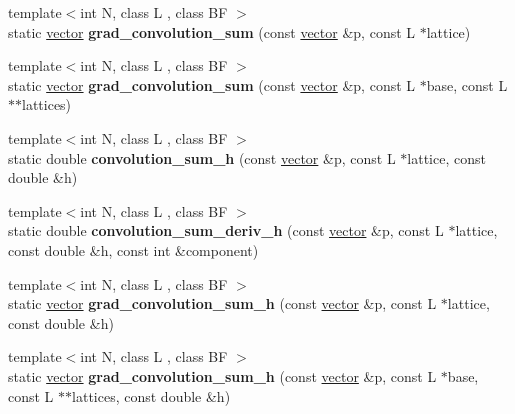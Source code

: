 \begin{DoxyCompactItemize}
{\footnotesize template$<$int N, class L , class BF $>$ }\\static \hyperlink{namespacesisl_a2069bd5374a9be042ff3ce3306d41e1a}{vector} {\bfseries grad\+\_\+convolution\+\_\+sum} (const \hyperlink{namespacesisl_a2069bd5374a9be042ff3ce3306d41e1a}{vector} \&p, const L $\ast$lattice)
\item 
\mbox{\label{classsisl_1_1nearest__neighbor_a0664ce6f5183fe3bcdf4397523bb9956}} 
{\footnotesize template$<$int N, class L , class BF $>$ }\\static \hyperlink{namespacesisl_a2069bd5374a9be042ff3ce3306d41e1a}{vector} {\bfseries grad\+\_\+convolution\+\_\+sum} (const \hyperlink{namespacesisl_a2069bd5374a9be042ff3ce3306d41e1a}{vector} \&p, const L $\ast$base, const L $\ast$$\ast$lattices)
\item 
\mbox{\label{classsisl_1_1nearest__neighbor_a879c49cd3b642c8ddc5d5da4426b0e7f}} 
{\footnotesize template$<$int N, class L , class BF $>$ }\\static double {\bfseries convolution\+\_\+sum\+\_\+h} (const \hyperlink{namespacesisl_a2069bd5374a9be042ff3ce3306d41e1a}{vector} \&p, const L $\ast$lattice, const double \&h)
\item 
\mbox{\label{classsisl_1_1nearest__neighbor_a5f13e5fd3eee54b8005a6398bae01ef4}} 
{\footnotesize template$<$int N, class L , class BF $>$ }\\static double {\bfseries convolution\+\_\+sum\+\_\+deriv\+\_\+h} (const \hyperlink{namespacesisl_a2069bd5374a9be042ff3ce3306d41e1a}{vector} \&p, const L $\ast$lattice, const double \&h, const int \&component)
\item 
\mbox{\label{classsisl_1_1nearest__neighbor_a704a5a15db9d47c51137d384c1bdbeef}} 
{\footnotesize template$<$int N, class L , class BF $>$ }\\static \hyperlink{namespacesisl_a2069bd5374a9be042ff3ce3306d41e1a}{vector} {\bfseries grad\+\_\+convolution\+\_\+sum\+\_\+h} (const \hyperlink{namespacesisl_a2069bd5374a9be042ff3ce3306d41e1a}{vector} \&p, const L $\ast$lattice, const double \&h)
\item 
\mbox{\label{classsisl_1_1nearest__neighbor_a75d7b379c635661c35fafd06b8482b89}} 
{\footnotesize template$<$int N, class L , class BF $>$ }\\static \hyperlink{namespacesisl_a2069bd5374a9be042ff3ce3306d41e1a}{vector} {\bfseries grad\+\_\+convolution\+\_\+sum\+\_\+h} (const \hyperlink{namespacesisl_a2069bd5374a9be042ff3ce3306d41e1a}{vector} \&p, const L $\ast$base, const L $\ast$$\ast$lattices, const double \&h)
\end{DoxyCompactItemize}


